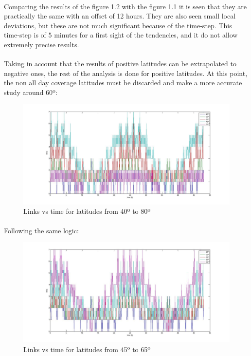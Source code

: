 \documentclass[12pt,a4paper]{report}
\begin{document}
\paragraph{}
Comparing the results of the figure 1.2 with the figure 1.1 it is seen that they are practically the same with an offset of 12 hours. They are also seen small local deviations, but these are not much significant because of the time-step. This time-step is of 5 minutes for a first sight of the tendencies, and it do not allow extremely precise results.
\paragraph{}
Taking in account that the results of positive latitudes can be extrapolated to negative ones, the rest of the analysis is done for positive latitudes. At this point, the non all day coverage latitudes must be discarded and make a more accurate study around 60º:

\begin{figure}[H]
\begin{center}
\includegraphics[scale=0.30]{40_10_80_lat.jpg}
\caption{Links vs time for latitudes from 40º to 80º}
\end{center}
\end{figure}

\paragraph{}
Following the same logic:

\begin{figure}[H]
\begin{center}
\includegraphics[scale=0.30]{45_5_65_lat.jpg}
\caption{Links vs time for latitudes from 45º to 65º}
\end{center}
\end{figure}
\end{document}

